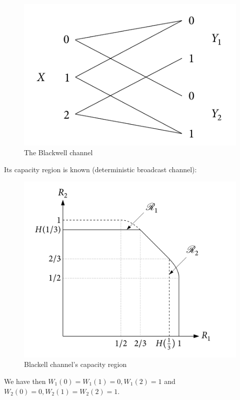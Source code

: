 \documentclass[11pt]{article}
\theoremstyle{definition}
\theoremstyle{remark}
\begin{document}
\begin{figure}[!h]
  \begin{center}
    \includegraphics[scale=0.3]{Blackwell.png}
    \caption{The Blackwell channel \cite{Meulen75}}
  \end{center}
\end{figure}

Its capacity region is known (deterministic broadcast channel):

\begin{figure}[!h]
  \begin{center}
    \includegraphics[scale=0.4]{BlackellRateRegion.png}
    \caption{Blackell channel's capacity region}
  \end{center}
\end{figure}

We have then $W_1(0)=W_1(1)=0, W_1(2)=1$ and $W_2(0)=0, W_2(1)=W_2(2)=1$.



\end{document}
